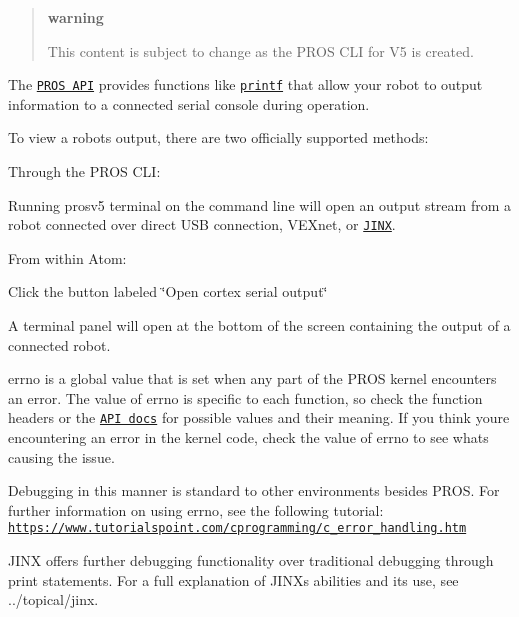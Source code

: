 \begin{quote}
{\bfseries warning}

This content is subject to change as the P\+R\+OS C\+LI for V5 is created. \end{quote}


The \href{../../api/index.html}{\tt P\+R\+OS A\+PI} provides functions like \href{http://www.cplusplus.com/reference/cstdio/printf/}{\tt printf} that allow your robot to output information to a connected serial console during operation.

To view a robot\textquotesingle{}s output, there are two officially supported methods\+:


\begin{DoxyEnumerate}
\item Through the P\+R\+OS C\+LI\+:

Running {\ttfamily prosv5 terminal} on the command line will open an output stream from a robot connected over direct U\+SB connection, V\+E\+Xnet, or \href{./tutorials/topical/jinx.html}{\tt J\+I\+NX}.
\item From within Atom\+:

Click the button labeled \char`\"{}\+Open cortex serial output\char`\"{}
\end{DoxyEnumerate}



A terminal panel will open at the bottom of the screen containing the output of a connected robot.



{\ttfamily errno} is a global value that is set when any part of the P\+R\+OS kernel encounters an error. The value of {\ttfamily errno} is specific to each function, so check the function headers or the \href{../../api/index.html}{\tt A\+PI docs} for possible values and their meaning. If you think you\textquotesingle{}re encountering an error in the kernel code, check the value of {\ttfamily errno} to see what\textquotesingle{}s causing the issue.

Debugging in this manner is standard to other environments besides P\+R\+OS. For further information on using {\ttfamily errno}, see the following tutorial\+: \href{https://www.tutorialspoint.com/cprogramming/c_error_handling.htm}{\tt https\+://www.\+tutorialspoint.\+com/cprogramming/c\+\_\+error\+\_\+handling.\+htm}

J\+I\+NX offers further debugging functionality over traditional debugging through print statements. For a full explanation of J\+I\+NX\textquotesingle{}s abilities and its use, see ../topical/jinx. 